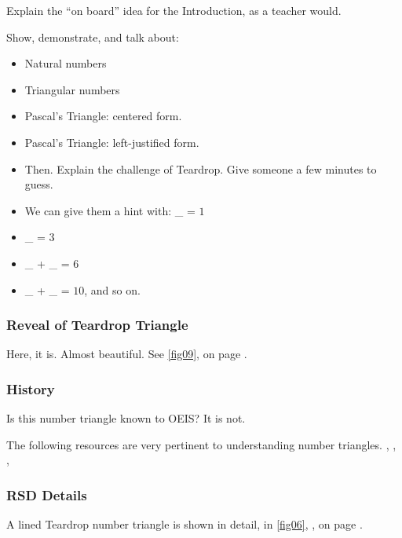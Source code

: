 \documentclass[12pt]{article}
\begin{document}
        Explain the ``on board'' idea for the Introduction, as a teacher would.
        
        Show, demonstrate, and talk about:
        
        \begin{itemize}
            \item Natural numbers
            \item Triangular numbers
            \item Pascal's Triangle: centered form.
            \item Pascal's Triangle: left-justified form.
            \item Then. Explain the challenge of Teardrop. Give someone a few minutes to guess.
            \item We can give them a hint with: \_ = $ 1 $
            \item \_ = $ 3 $
            \item \_ + \_ = $ 6 $
            \item \_ + \_ = $ 10 $, and so on.
        \end{itemize}
        
        \subsubsection{Reveal of Teardrop Triangle}
        \label{secb:21}
        
        Here, it is. Almost beautiful. See \cref{fig09},  on page \pageref{fig09}.
        
        \subsubsection{History}
        \label{secb:22}
        
        Is this number triangle known to OEIS? It is not.
        
        The following resources are very pertinent to understanding number triangles.
        \cite{Graham.1994}, \cite{Wikipedia.}, \cite{Koshy.2011}, \cite{PaulBarry.2016}
        
        \subsubsection{RSD Details}
        \label{secb:28}
        
        A lined Teardrop number triangle is shown in detail, in \cref{fig06}, , on 
        page \pageref{fig06}.
        
\end{document}
